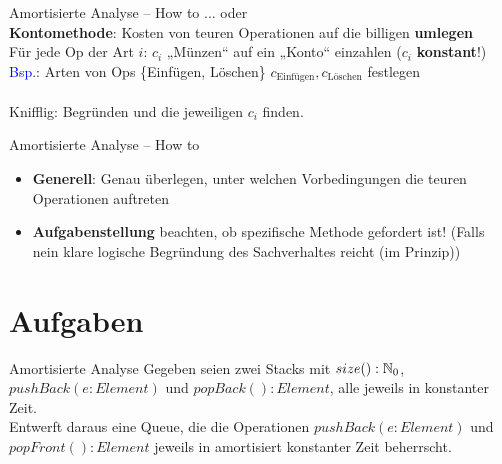 \begin{frame}{Amortisierte Analyse – How to}
	... oder \\
	\textbf{Kontomethode}: Kosten von teuren Operationen auf die billigen \textbf{umlegen} \\ \forcenewline 
	\pause
	\hanging Für jede Op der Art $i$: \quad  $c_i$ „Münzen“ auf ein „Konto“ einzahlen ($c_i$ \textbf{konstant}!) \\ 
	\pause
	\textcolor{blue}{Bsp}.: \hanging Arten von Ops \{Einfügen, Löschen\} \impl $c_\text{Einfügen}, c_\text{Löschen}$ festlegen \\
	\pause
	 \\
	\pause \forcenewline
	Knifflig: Begründen und die jeweiligen $c_i$ finden.
\end{frame}

\begin{frame}{Amortisierte Analyse – How to}
	\begin{itemize}
		\item \textbf{Generell}: Genau überlegen, unter welchen Vorbedingungen die teuren Operationen auftreten
		\item \textbf{Aufgabenstellung} beachten, ob spezifische Methode gefordert ist! (Falls nein \impl klare logische Begründung des Sachverhaltes reicht (im Prinzip))
	\end{itemize}
\end{frame}

\section{Aufgaben}

\begin{frame}{Amortisierte Analyse}
	Gegeben seien zwei Stacks mit $size() : \mathbb{N}_0$, $pushBack(e : Element)$ und $popBack() : Element$, alle jeweils in konstanter Zeit. \\
	\smallskip
	Entwerft daraus eine Queue, die die Operationen $pushBack(e : Element)$ und $popFront() : Element$ jeweils in amortisiert konstanter Zeit beherrscht.
\end{frame}

